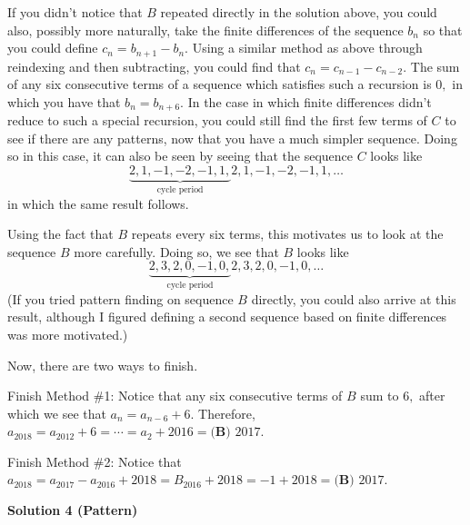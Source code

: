 \begin{enumerate}
 If you didn’t notice that $B$ repeated directly in the solution above, you could also, possibly more naturally, take the finite differences of the sequence $b_n$ so that you could define $c_n = b_{n+1} - b_n.$ Using a similar method as above through reindexing and then subtracting, you could find that $c_n = c_{n-1} - c_{n-2}.$ The sum of any six consecutive terms of a sequence which satisfies such a recursion is $0,$ in which you have that $b_{n} = b_{n+6}.$ In the case in which finite differences didn’t reduce to such a special recursion, you could still find the first few terms of $C$ to see if there are any patterns, now that you have a much simpler sequence. Doing so in this case, it can also be seen by seeing that the sequence $C$ looks like 
 \[\underbrace{2, 1, -1, -2, -1, 1,}_{\text{cycle period}} 2, 1, -1, -2, -1, 1, \ldots\] in which the same result follows. 

 Using the fact that $B$ repeats every six terms, this motivates us to look at the sequence $B$ more carefully. Doing so, we see that $B$ looks like 
 \[\underbrace{2, 3, 2, 0, -1, 0,}_{\text{cycle period}} 2, 3, 2, 0, -1, 0, \ldots\] (If you tried pattern finding on sequence $B$ directly, you could also arrive at this result, although I figured defining a second sequence based on finite differences was more motivated.)

 Now, there are two ways to finish. 

 Finish Method \#1: Notice that any six consecutive terms of $B$ sum to $6,$ after which we see that $a_n = a_{n-6} + 6.$ Therefore, $a_{2018} = a_{2012} + 6 = \cdots = a_{2} + 2016 = \boxed{\textbf{(B) } 2017}.$

 Finish Method \#2: Notice that $a_{2018} = a_{2017} - a_{2016} + 2018 = B_{2016} + 2018 = -1 + 2018 = \boxed{\textbf{(B) } 2017}.$




\textbf{Solution 4 (Pattern)}


\end{enumerate}
